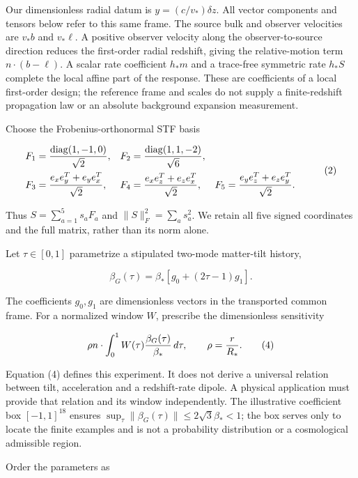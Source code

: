 \documentclass[aps,prd,preprint,onecolumn,notitlepage]{revtex4-2}
\begin{document}
Our dimensionless radial datum is \(y=(c/v_*)\delta z\). All vector components and tensors below refer to this same frame. The source bulk and observer velocities are \(v_*b\) and \(v_*\ell\). A positive observer velocity along the observer-to-source direction reduces the first-order radial redshift, giving the relative-motion term \(n\cdot(b-\ell)\). A scalar rate coefficient \(h_*m\) and a trace-free symmetric rate \(h_*S\) complete the local affine part of the response. These are coefficients of a local first-order design; the reference frame and scales do not supply a finite-redshift propagation law or an absolute background expansion measurement.

Choose the Frobenius-orthonormal STF basis

\[
\begin{aligned}
F_1&={\operatorname{diag}(1,-1,0)\over\sqrt2},&
F_2&={\operatorname{diag}(1,1,-2)\over\sqrt6},\\
F_3&={e_xe_y^T+e_ye_x^T\over\sqrt2},&
F_4&={e_xe_z^T+e_ze_x^T\over\sqrt2},&
F_5&={e_ye_z^T+e_ze_y^T\over\sqrt2}.
\end{aligned}                                                        \tag{2}
\]

Thus \(S=\sum_{a=1}^5s_aF_a\) and \(\|S\|_F^2=\sum_a s_a^2\). We retain all five signed coordinates and the full matrix, rather than its norm alone.

Let \(\tau\in[0,1]\) parametrize a stipulated two-mode matter-tilt history,

\[
\beta_G(\tau)=\beta_*[g_0+(2\tau-1)g_1].                 \tag{3}
\]

The coefficients \(g_0,g_1\) are dimensionless vectors in the transported common frame. For a normalized window \(W\), prescribe the dimensionless sensitivity

\[
\rho n\cdot\int_0^1 W(\tau){\beta_G(\tau)\over\beta_*}\,d\tau,
\qquad \rho={r\over R_*}.                               \tag{4}
\]

Equation (4) defines this experiment. It does not derive a universal relation between tilt, acceleration and a redshift-rate dipole. A physical application must provide that relation and its window independently. The illustrative coefficient box \([-1,1]^{18}\) ensures \(\sup_\tau\|\beta_G(\tau)\|\le2\sqrt3\beta_*<1\); the box serves only to locate the finite examples and is not a probability distribution or a cosmological admissible region.

Order the parameters as
\end{document}
